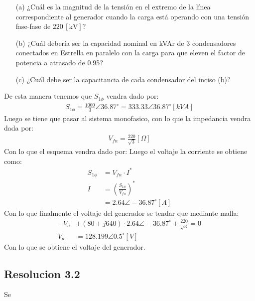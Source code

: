 \documentclass[
  11pt,
  letterpaper,
   addpoints,
   answers
  ]{exam}
\begin{document}
\begin{questions}
\begin{enumerate}
    \item[(a)] ¿Cuál es la magnitud de la tensión en el extremo de la línea correspondiente al generador cuando la carga está operando con una tensión fase-fase de \(220 \, [\text{kV}]\)?
    \item[(b)] ¿Cuál debería ser la capacidad nominal en kVAr de 3 condensadores conectados en Estrella en paralelo con la carga para que eleven el factor de potencia a atrasado de 0.95?
    \item[(c)] ¿Cuál debe ser la capacitancia de cada condensador del inciso (b)?
\end{enumerate}

De esta manera tenemos que $S_{1\phi}$ vendra dado por:
\begin{align}
    S_{1\phi} = \frac{1000}{3} \angle 36.87^{\circ} = 333.33 \angle 36.87^{\circ} [kVA]
\end{align}
Luego se tiene que pasar al sistema monofasico, con lo que la impedancia vendra dada por:
\begin{align}
    V_{fn} = \frac{220}{\sqrt{3}}[\Omega]
\end{align}
Con lo que el esquema vendra dado por:
Luego el voltaje la corriente se obtiene como:
\begin{align}
    S_{1\phi} &= V_{fn} \cdot I^{*}\\
    I &= \left(\frac{S_{1\phi}}{V_{fn}}\right)^{*}\\
    &= 2.64 \angle -36.87^{\circ} [A]
\end{align}
Con lo que finalmente el voltaje del generador se tendar que mediante malla:
\begin{align}
    -V_{a} &+ (80 + j640) \cdot 2.64 \angle -36.87^{\circ} + \frac{220}{\sqrt{3}} = 0\\
    V_{a} &= 128.199\angle 0.5^{\circ} [V]
\end{align}
Con lo que se obtiene el voltaje del generador.
\subsection{Resolucion 3.2}
Se 
\end{questions}
\newpage
\end{document}
